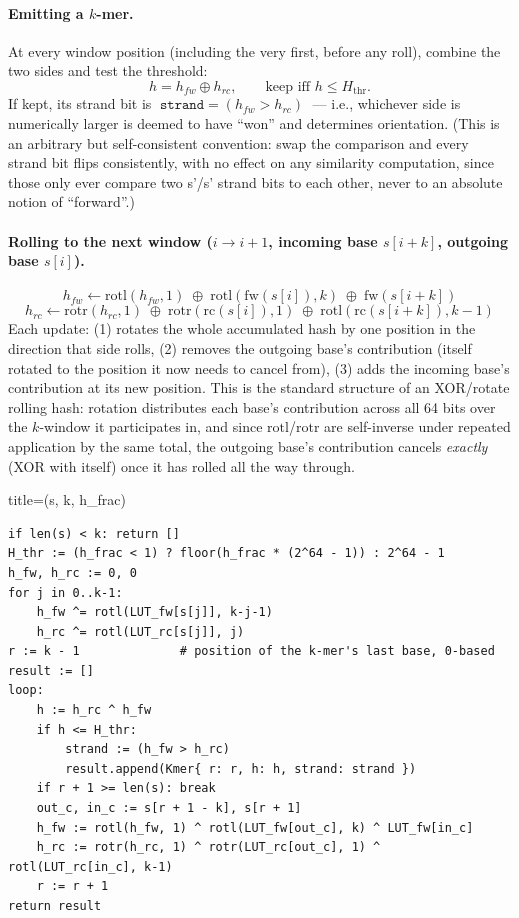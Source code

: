 \paragraph{Emitting a $k$-mer.} At every window position (including the very first, before any
roll), combine the two sides and test the threshold:
\[
  h = h_{fw} \oplus h_{rc}, \qquad \text{keep iff } h \le H_{\mathrm{thr}}.
\]
If kept, its strand bit is $\;\texttt{strand} = (h_{fw} > h_{rc})\;$ --- i.e., whichever side is
numerically larger is deemed to have ``won'' and determines orientation. (This is an arbitrary
but self-consistent convention: swap the comparison and every strand bit flips consistently, with
no effect on any similarity computation, since those only ever compare two s'/s' strand bits to each other, never to an absolute notion of ``forward''.)

\paragraph{Rolling to the next window ($i \to i+1$, incoming base $s[i{+}k]$, outgoing base
$s[i]$).}
\[
  h_{fw} \leftarrow \mathrm{rotl}(h_{fw}, 1) \;\oplus\; \mathrm{rotl}(\mathrm{fw}(s[i]), k)
  \;\oplus\; \mathrm{fw}(s[i{+}k])
\]
\[
  h_{rc} \leftarrow \mathrm{rotr}(h_{rc}, 1) \;\oplus\; \mathrm{rotr}(\mathrm{rc}(s[i]), 1)
  \;\oplus\; \mathrm{rotl}(\mathrm{rc}(s[i{+}k]), k-1)
\]
Each update: (1) rotates the whole accumulated hash by one position in the direction that side
rolls, (2) removes the outgoing base's contribution (itself rotated to the position it now needs
to cancel from), (3) adds the incoming base's contribution at its new position. This is the
standard structure of an XOR/rotate rolling hash: rotation distributes each base's contribution
across all 64 bits over the $k$-window it participates in, and since $\mathrm{rotl}$/$\mathrm{rotr}$
are self-inverse under repeated application by the same total, the outgoing base's contribution
cancels \emph{exactly} (XOR with itself) once it has rolled all the way through.

\begin{algobox}{title={(s, k, h\_frac)}}
\begin{verbatim}
if len(s) < k: return []
H_thr := (h_frac < 1) ? floor(h_frac * (2^64 - 1)) : 2^64 - 1
h_fw, h_rc := 0, 0
for j in 0..k-1:
    h_fw ^= rotl(LUT_fw[s[j]], k-j-1)
    h_rc ^= rotl(LUT_rc[s[j]], j)
r := k - 1              # position of the k-mer's last base, 0-based
result := []
loop:
    h := h_rc ^ h_fw
    if h <= H_thr:
        strand := (h_fw > h_rc)
        result.append(Kmer{ r: r, h: h, strand: strand })
    if r + 1 >= len(s): break
    out_c, in_c := s[r + 1 - k], s[r + 1]
    h_fw := rotl(h_fw, 1) ^ rotl(LUT_fw[out_c], k) ^ LUT_fw[in_c]
    h_rc := rotr(h_rc, 1) ^ rotr(LUT_rc[out_c], 1) ^ rotl(LUT_rc[in_c], k-1)
    r := r + 1
return result
\end{verbatim}
\end{algobox}

